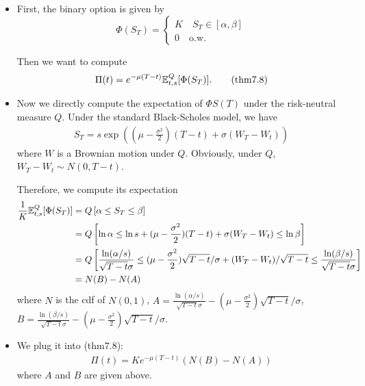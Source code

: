 \begin{example}
	\begin{itemize}
		\item First, the binary option is given by 
		$$\Phi( S_T ) = \begin{cases}
		K  \quad S_T \in [\alpha, \beta] \\
		0 \quad \text{o.w.}
		\end{cases}  $$
		
		Then we want to compute 
		\begin{align*}
		\Pi(t) = e^{-\mu(T-t)} \mathbb{E}_{t,s}^Q [ \Phi(S_T) ]. \tag{thm7.8}
		\end{align*}
		
		\item Now we directly compute the expectation of $\Phi S(T)$ under the risk-neutral measure $Q$. Under the standard Black-Scholes model, we have
		\begin{align*}
		S_T = s \exp\left(  (\mu - \frac{\sigma^2}{2})(T-t) + \sigma(W_T-W_t)   \right)
		\end{align*}
		where $W$ is a Brownian motion under $Q$. Obviously, under $Q$, $W_T - W_t\sim N(0, T-t)$.
		
		Therefore, we compute its expectation 
		\begin{align*}
		\frac{1}{K}\mathbb{E}_{t,s}^Q [ \Phi(S_T) ] &=  Q\left[  \alpha \leq S_T \leq \beta \right] \\
		&= Q\left[ \ln \alpha \leq  \ln s + (\mu - \frac{\sigma^2}{2})(T-t) + \sigma(W_T-W_t)  \leq \ln \beta \right] \\
		&= Q\left[ \frac{ \ln (\alpha/s) }{ \sqrt{T-t}\sigma } \leq    (\mu - \frac{\sigma^2}{2})\sqrt{T-t}/\sigma + (W_T-W_t)/\sqrt{T-t}  \leq \frac{ \ln (\beta/s) }{ \sqrt{T-t}\sigma }  \right]\\
		&= N(B) - N(A)
		\end{align*} 
		where $N$ is the cdf of $N(0,1)$, $A = \frac{ \ln (\alpha/s) }{ \sqrt{T-t}\sigma } - (\mu - \frac{\sigma^2}{2})\sqrt{T-t}/\sigma$, $B =  \frac{ \ln (\beta/s) }{ \sqrt{T-t}\sigma } - (\mu - \frac{\sigma^2}{2})\sqrt{T-t}/\sigma$.
		
		\item We plug it into (thm7.8):
		\begin{align*}
		\Pi(t) = K e^{-\mu(T-t)} \left(  N(B) - N(A) \right) 
		\end{align*}
		where $A$ and $B$ are given above.
		
	\end{itemize}
\end{example}

